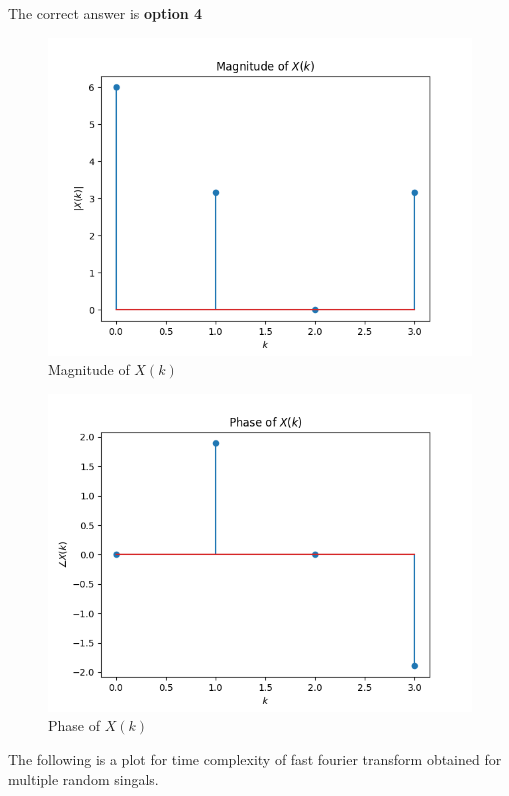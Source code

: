 \documentclass[journal,12pt,twocolumn]{IEEEtran}
\begin{document}
The correct answer is \textbf{option 4}
\begin{figure}[!ht]
    \centering
    \includegraphics[width=\columnwidth]{plot/magnitude}
    \caption{Magnitude of $X(k)$}
    \label{magnitude}
\end{figure}
\begin{figure}[H]
    \centering
    \includegraphics[width=\columnwidth]{plot/phase}
    \caption{Phase of $X(k)$}
    \label{magnitude}
\end{figure}
The following is a plot for time complexity of fast fourier transform obtained for multiple random singals.
\end{document}
